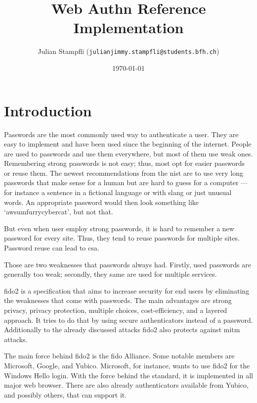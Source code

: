 \documentclass[a4paper, 11pt]{scrartcl}
\begin{document}
\title{Web Authn Reference Implementation}
\date{\today} 
\author{ Julian Stampfli (\texttt{julianjimmy.stampfli@students.bfh.ch}) }
\maketitle
\setcounter{tocdepth}{2}
\tableofcontents
\clearpage

\section{Introduction}

Passwords are the most commonly used way to authenticate a user. They are easy to implement and have been used since the beginning of the internet. People are used to passwords and use them everywhere, but most of them use weak ones. Remembering strong passwords is not easy; thus, most opt for easier passwords or reuse them. The newest recommendations from the \gls{nist} are to use very long passwords that make sense for a human but are hard to guess for a computer — for instance a sentence in a fictional language or with slang or just unusual words. An appropriate password would then look something like `awsumfurrycybercat', but not that. \cite{nist:pw:blog, nist:pw}

But even when user employ strong passwords, it is hard to remember a new password for every site. Thus, they tend to reuse passwords for multiple sites. Password reuse can lead to \gls{csa}. \cite{panda:pwreuse, xkcd:pwreuse} 

Those are two weaknesses that passwords always had. Firstly, used passwords are generally too weak; secondly, they same are used for multiple services. 

\gls{fido2} is a specification that aims to increase security for end users by eliminating the weaknesses that come with passwords. The main advantages are strong privacy, privacy protection, multiple choices, cost-efficiency, and a layered approach. It tries to do that by using secure authenticators instead of a password.  Additionally to the already discussed attacks \gls{fido2} also protects against \gls{mitm} attacks. \cite{yubico:whatIsFido2} 

The main force behind \gls{fido2} is the \gls{fido} Alliance. Some notable members are Microsoft, Google, and Yubico. Microsoft, for instance, wants to use \gls{fido2} for the Windows Hello login. \cite{yubico:ms} With the force behind the standard, it is implemented in all major web browser. \cite{fido:browser} There are also already authenticators available from Yubico, and possibly others, that can support it. \cite{yubico:yubikey5}
\end{document}
